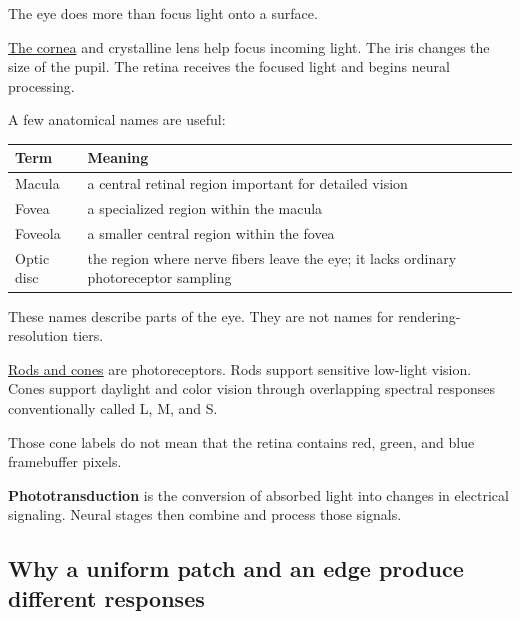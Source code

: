 The eye does more than focus light onto a surface.

\hyperref[appendix-f90cee1be7a4]{The cornea} and crystalline lens help focus incoming light. The iris changes the size of the pupil. The retina receives the focused light and begins neural processing.

A few anatomical names are useful:

{\def\LTcaptype{none} %
\begin{longtable}[]{@{}
  >{\raggedright\arraybackslash}p{}
  >{\raggedright\arraybackslash}p{}@{}}
\toprule\noalign{}
\begin{minipage}[b]{\linewidth}\raggedright
Term
\end{minipage} & \begin{minipage}[b]{\linewidth}\raggedright
Meaning
\end{minipage} \\
\midrule\noalign{}
\endhead
\bottomrule\noalign{}
\endlastfoot
Macula & a central retinal region important for detailed vision \\
Fovea & a specialized region within the macula \\
Foveola & a smaller central region within the fovea \\
Optic disc & the region where nerve fibers leave the eye; it lacks ordinary photoreceptor sampling \\
\end{longtable}
}

These names describe parts of the eye. They are not names for rendering-resolution tiers.

\hyperref[appendix-7281c15ac44a]{Rods and cones} are photoreceptors. Rods support sensitive low-light vision. Cones support daylight and color vision through overlapping spectral responses conventionally called L, M, and S.

Those cone labels do not mean that the retina contains red, green, and blue framebuffer pixels.

\textbf{Phototransduction} is the conversion of absorbed light into changes in electrical signaling. Neural stages then combine and process those signals.

\subsection{Why a uniform patch and an edge produce different responses}\label{04-visual-computing-ii-ch043-why-a-uniform-patch-and-an-edge-produce-different-responses}

